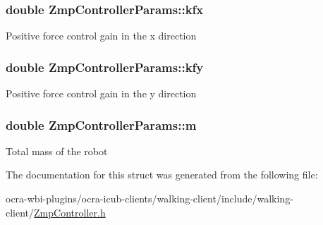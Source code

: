 \hypertarget{structZmpControllerParams_a92d3cbfd3c0c1f1df5115b97825889fb}{
\subsubsection[{kfx}]{\setlength{\rightskip}{0pt plus 5cm}double {\bf \-Zmp\-Controller\-Params\-::kfx}}}\label{structZmpControllerParams_a92d3cbfd3c0c1f1df5115b97825889fb}
\-Positive force control gain in the x direction \hypertarget{structZmpControllerParams_ab90ab2a81a4a9060e5afe9ee8d144e6a}{
\subsubsection[{kfy}]{\setlength{\rightskip}{0pt plus 5cm}double {\bf \-Zmp\-Controller\-Params\-::kfy}}}\label{structZmpControllerParams_ab90ab2a81a4a9060e5afe9ee8d144e6a}
\-Positive force control gain in the y direction \hypertarget{structZmpControllerParams_a09a7a86043a6b356478105f00ad84049}{
\subsubsection[{m}]{\setlength{\rightskip}{0pt plus 5cm}double {\bf \-Zmp\-Controller\-Params\-::m}}}\label{structZmpControllerParams_a09a7a86043a6b356478105f00ad84049}
\-Total mass of the robot 

\-The documentation for this struct was generated from the following file\-:\begin{DoxyCompactItemize}
\item 
ocra-\/wbi-\/plugins/ocra-\/icub-\/clients/walking-\/client/include/walking-\/client/\hyperlink{ZmpController_8h}{\-Zmp\-Controller.\-h}\end{DoxyCompactItemize}
